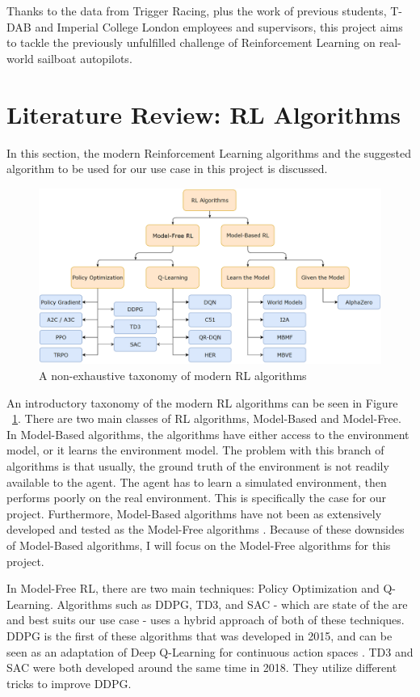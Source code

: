 \documentclass[12pt,twoside]{report}
\begin{document}
Thanks to the data from Trigger Racing, plus the work of previous students, T-DAB and Imperial College London employees and supervisors, this project aims to tackle the previously unfulfilled challenge of Reinforcement Learning on real-world sailboat autopilots.

\section{Literature Review: RL Algorithms}
In this section, the modern Reinforcement Learning algorithms and the suggested algorithm to be used for our use case in this project is discussed.

\begin{figure}[h]
\centering
\includegraphics[width = \hsize]{figures/RL algorithms.png}
\caption{A non-exhaustive taxonomy of modern RL algorithms \cite{openai:rl-algs}}
\label{fig:rl-algs}
\end{figure}

An introductory taxonomy of the modern RL algorithms can be seen in Figure ~\ref{fig:rl-algs}. There are two main classes of RL algorithms, Model-Based and Model-Free. In Model-Based algorithms, the algorithms have either access to the environment model, or it learns the environment model. The problem with this branch of algorithms is that usually, the ground truth of the environment is not readily available to the agent. The agent has to learn a simulated environment, then performs poorly on the real environment. This is specifically the case for our project. Furthermore, Model-Based algorithms have not been as extensively developed and tested as the Model-Free algorithms \cite{openai:rl-algs}. Because of these downsides of Model-Based algorithms, I will focus on the Model-Free algorithms for this project.

In Model-Free RL, there are two main techniques: Policy Optimization and Q-Learning. Algorithms such as DDPG, TD3, and SAC - which are state of the are and best suits our use case - uses a hybrid approach of both of these techniques.
DDPG is the first of these algorithms that was developed in 2015, and can be seen as an adaptation of Deep Q-Learning for continuous action spaces \cite{ddpg}. TD3 and SAC were both developed around the same time in 2018. They utilize different tricks to improve DDPG.
\end{document}
